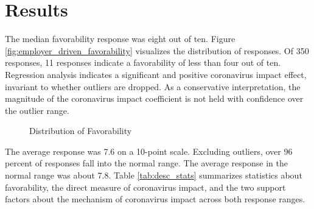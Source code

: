 \documentclass[review]{elsarticle}
\begin{document}
\section{Results}

The median favorability response was eight out of ten.
Figure \ref{fig:employer_driven_favorability} visualizes the distribution of responses.
Of 350 responses, 11 responses indicate a favorability of less than four out of ten.
Regression analysis indicates a significant and positive coronavirus impact effect,
invariant to whether outliers are dropped.
As a conservative interpretation,
the magnitude of the coronavirus impact coefficient
is not held with confidence over the outlier range.

\begin{figure}[h!]
    \centering
    \caption{Distribution of Favorability}


    \label{fig:one}
    \end{figure}

The average response was 7.6 on a 10-point scale.
Excluding outliers, over 96 percent of responses fall into the normal range.
The average response in the normal range was about 7.8.
Table \ref{tab:desc_stats} summarizes statistics about favorability,
the direct measure of coronavirus impact,
and the two support factors about the mechanism of coronavirus impact
across both response ranges.
\end{document}
